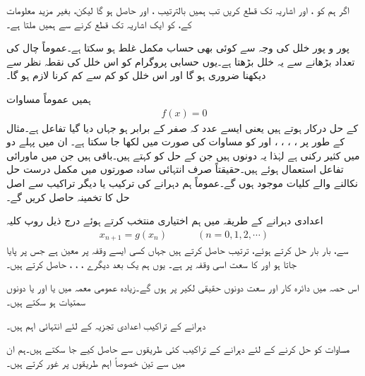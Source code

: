 اگر ہم  کو ،  اور  اشاریہ تک قطع کریں تب ہمیں بالترتیب ،  اور  حاصل ہو گا لیکن، بغیر مزید  معلومات کے،  کو ایک اشاریہ تک قطع کرنے سے ہمیں  ملتا ہے۔

پور و پور خلل کی وجہ سے کوئی بھی حساب مکمل غلط ہو سکتا ہے۔عموماً چال کی تعداد بڑھانے سے یہ خلل بڑھتا ہے۔یوں حسابی پروگرام کو اس خلل کی نقطہ نظر سے دیکھنا ضروری ہو گا اور اس خلل کو کم سے کم کرنا لازم ہو گا۔

ہمیں عموماً مساوات 
\begin{align}\label{مساوات_اعدادی_تفاعل_الف}
f(x)=0
\end{align}
کے حل درکار ہوتے ہیں یعنی ایسے عدد  کہ  صفر کے برابر ہو جہاں  دیا گیا تفاعل ہے۔مثال کے طور پر ، ، ، ،  اور  کو مساوات  کی صورت میں لکھا جا سکتا ہے۔ ان میں پہلے دو میں  کثیر رکنی ہے لہٰذا یہ دونوں  ہیں جن کے حل کو  کہتے ہیں۔باقی  ہیں جن میں ماورائی تفاعل استعمال ہوئے ہیں۔حقیقتاً صرف انتہائی سادہ صورتوں میں مکمل درست حل نکالنے والے کلیات موجود ہوں گے۔عموماً ہم دہرانے کی ترکیب یا دیگر تراکیب سے اصل حل کا تخمینہ حاصل کریں گے۔

اعدادی دہرانے کے طریقہ میں ہم اختیاری  منتخب کرتے ہوئے  درج ذیل روپ کلیہ
\begin{align}\label{مساوات_اعدادی_تفاعل_ب}
x_{n+1}=g(x_n)\quad \quad \quad (n=0,1,2,\cdots)
\end{align}
سے، بار بار حل کرتے ہوئے، ترتیب  حاصل کرتے ہیں جہاں  کسی ایسے وقفہ پر معین ہے جس پر  پایا جاتا ہو اور   کا سعت اسی وقفہ پر ہے۔ یوں ہم یک بعد دیگرے ،  ، ،  حاصل کرتے ہیں۔

اس حصہ میں دائرہ کار اور سعت  دونوں حقیقی لکیر پر ہوں گے۔زیادہ عمومی معمہ میں  یا  اور یا دونوں سمتیات ہو سکتے ہیں۔

دہرانے کے تراکیب اعدادی تجزیہ کے لئے انتہائی اہم ہیں۔

مساوات  کو حل کرنے کے لئے  دہرانے کے تراکیب کئی طریقوں سے حاصل کیے جا سکتے ہیں۔ہم ان میں سے تین خصوصاً اہم طریقوں پر غور کرتے ہیں۔

